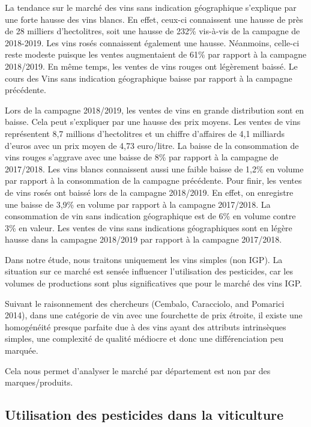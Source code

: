 \documentclass[11pt,]{article}
\begin{document}
La tendance sur le marché des vins sans indication géographique
s'explique par une forte hausse des vins blancs. En effet, ceux-ci
connaissent une hausse de près de 28 milliers d'hectolitres, soit une
hausse de 232\% vis-à-vis de la campagne de 2018-2019. Les vins rosés
connaissent également une hausse. Néanmoins, celle-ci reste modeste
puisque les ventes augmentaient de 61\% par rapport à la campagne
2018/2019. En même temps, les ventes de vins rouges ont légèrement
baissé. Le cours des Vins sans indication géographique baisse par
rapport à la campagne précédente.

Lors de la campagne 2018/2019, les ventes de vins en grande distribution
sont en baisse. Cela peut s'expliquer par une hausse des prix moyens.
Les ventes de vins représentent 8,7 millions d'hectolitres et un chiffre
d'affaires de 4,1 milliards d'euros avec un prix moyen de 4,73
euro/litre. La baisse de la consommation de vins rouges s'aggrave avec
une baisse de 8\% par rapport à la campagne de 2017/2018. Les vins
blancs connaissent aussi une faible baisse de 1,2\% en volume par
rapport à la consommation de la campagne précédente. Pour finir, les
ventes de vins rosés ont baissé lors de la campagne 2018/2019. En effet,
on enregistre une baisse de 3,9\% en volume par rapport à la campagne
2017/2018. La consommation de vin sans indication géographique est de
6\% en volume contre 3\% en valeur. Les ventes de vins sans indications
géographiques sont en légère hausse dans la campagne 2018/2019 par
rapport à la campagne 2017/2018.

Dans notre étude, nous traitons uniquement les vins simples (non IGP).
La situation sur ce marché est sensée influencer l'utilisation des
pesticides, car les volumes de productions sont plus significatives que
pour le marché des vins IGP.

Suivant le raisonnement des chercheurs (Cembalo, Caracciolo, and
Pomarici 2014), dans une catégorie de vin avec une fourchette de prix
étroite, il existe une homogénéité presque parfaite due à des vins ayant
des attributs intrinsèques simples, une complexité de qualité médiocre
et donc une différenciation peu marquée.

Cela nous permet d'analyser le marché par département est non par des
marques/produits.

\hypertarget{utilisation-des-pesticides-dans-la-viticulture}{%
\subsection{Utilisation des pesticides dans la
viticulture}\label{utilisation-des-pesticides-dans-la-viticulture}}
\end{document}
